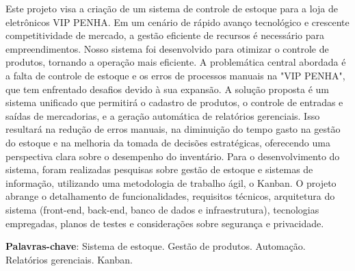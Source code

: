 \documentclass[
	12pt,				%
	openany,			%
	twoside,			%
	a4paper,			%
	english,			%
	brazil				%
	]{abntex2}
\begin{document}
\setlength{\absparsep}{18pt} %
\begin{resumo}
Este projeto visa a criação de um sistema de controle de estoque para a loja de eletrônicos VIP PENHA. Em um cenário de rápido avanço tecnológico e crescente competitividade de mercado, a gestão eficiente de recursos é necessário para empreendimentos. Nosso sistema foi desenvolvido para otimizar o controle de produtos, tornando a operação mais eficiente.
A problemática central abordada é a falta de controle de estoque e os erros de processos manuais na "VIP PENHA", que tem enfrentado desafios devido à sua expansão. A solução proposta é um sistema unificado que permitirá o cadastro de produtos, o controle de entradas e saídas de mercadorias, e a geração automática de relatórios gerenciais. Isso resultará na redução de erros manuais, na diminuição do tempo gasto na gestão do estoque e na melhoria da tomada de decisões estratégicas, oferecendo uma perspectiva clara sobre o desempenho do inventário.
Para o desenvolvimento do sistema, foram realizadas pesquisas sobre gestão de estoque e sistemas de informação, utilizando uma metodologia de trabalho ágil, o Kanban. O projeto abrange o detalhamento de funcionalidades, requisitos técnicos, arquitetura do sistema (front-end, back-end, banco de dados e infraestrutura), tecnologias empregadas, planos de testes e considerações sobre segurança e privacidade. 

 \textbf{Palavras-chave}: Sistema de estoque. Gestão de produtos. Automação. Relatórios gerenciais. Kanban. 
\end{resumo}
\end{document}
